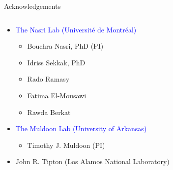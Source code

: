 \documentclass[
  ignorenonframetext,
]{beamer}
\providecommand{\tightlist}{%
  \setlength{\itemsep}{0pt}\setlength{\parskip}{0pt}}\usepackage{longtable,booktabs,array}
\begin{document}
\begin{frame}{Acknowledgements}
\protect\hypertarget{acknowledgements}{}
\begin{columns}[T]
\begin{column}{0.5\textwidth}
\begin{itemize}
\item
  \textcolor{blue}{The Nasri Lab (Université de Montréal)}

  \begin{itemize}
  \item
    Bouchra Nasri, PhD (PI)
  \item
    Idriss Sekkak, PhD
  \item
    Rado Ramasy
  \item
    Fatima El-Mousawi
  \item
    Rawda Berkat
  \end{itemize}
\end{itemize}

\break

\begin{itemize}
\item
  \textcolor{blue}{The Muldoon Lab (University of Arkansas)}

  \begin{itemize}
  \tightlist
  \item
    Timothy J. Muldoon (PI)
  \end{itemize}
\item
  John R. Tipton (Los Alamos National Laboratory)
\end{itemize}
\end{column}


\end{columns}
\end{frame}
\end{document}
